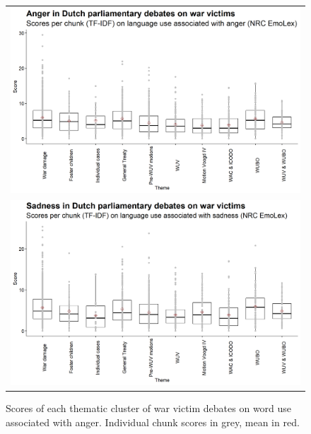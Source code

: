 \documentclass{dhbenelux}
\begin{document}
\begin{figure}
    \centering
    \begin{tabular}{c}
    \includegraphics[width=0.9\linewidth]{Images/boxplot1.png}
    \\
    \includegraphics[width=0.9\linewidth]{Images/boxplot2.png}
    \\ 
    \end{tabular}
    \caption{Scores of each thematic cluster of war victim debates on word use associated with anger. Individual chunk scores in grey, mean in red.}
    \label{fig:boxplot}
\end{figure}

\end{document}

